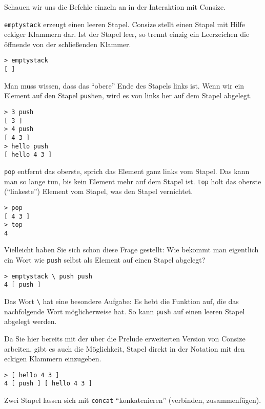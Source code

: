 Schauen wir uns die Befehle einzeln an in der Interaktion mit Consize.


\verb|emptystack| erzeugt einen leeren Stapel. Consize stellt einen Stapel mit Hilfe eckiger Klammern dar. Ist der Stapel leer, so trennt einzig ein Leerzeichen die öffnende von der schließenden Klammer.

\begin{verbatim}
> emptystack
[ ]
\end{verbatim}

Man muss wissen, dass das "`obere"' Ende des Stapels links ist. Wenn wir ein Element auf den Stapel \verb|push|en, wird es von links her auf dem Stapel abgelegt.

\begin{verbatim}
> 3 push
[ 3 ]
> 4 push
[ 4 3 ]
> hello push
[ hello 4 3 ]
\end{verbatim}

\verb|pop| entfernt das oberste, sprich das Element ganz links vom Stapel. Das kann man so lange tun, bis kein Element mehr auf dem Stapel ist. \verb|top| holt das oberste ("`linkeste"') Element vom Stapel, was den Stapel vernichtet.

\begin{verbatim}
> pop
[ 4 3 ]
> top
4
\end{verbatim}

Vielleicht haben Sie sich schon diese Frage gestellt: Wie bekommt man eigentlich ein Wort wie \verb|push| selbst als Element auf einen Stapel abgelegt?

\begin{verbatim}
> emptystack \ push push
4 [ push ]
\end{verbatim}

Das Wort \verb|\| hat eine besondere Aufgabe: Es hebt die Funktion auf, die das nachfolgende Wort möglicherweise hat. So kann \verb|push| auf einen leeren Stapel abgelegt werden.

Da Sie hier bereits mit der über die Prelude erweiterten Version von Consize arbeiten, gibt es auch die Möglichkeit, Stapel direkt in der Notation mit den eckigen Klammern einzugeben.

\begin{verbatim}
> [ hello 4 3 ]
4 [ push ] [ hello 4 3 ]
\end{verbatim}

Zwei Stapel lassen sich mit \verb|concat| "`konkatenieren"' (verbinden, zusammenfügen).

